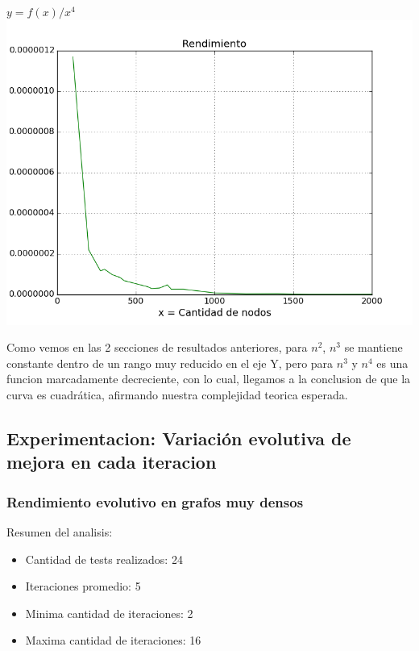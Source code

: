 \begin{center}
	\textbf{$y = f(x)/x^4$}\\
	\includegraphics[scale=0.7]{experimentos/bqlocal/rendimiento_aristas_cuadraticas_3/complexity_med_over_n_fourth.png}
\end{center}

Como vemos en las 2 secciones de resultados anteriores, para $n^2$, $n^3$ se mantiene constante dentro de un rango muy reducido en el eje Y, pero para $n^3$ y $n^4$ es una funcion marcadamente decreciente, con lo cual, llegamos a la conclusion de que la curva es cuadr\'atica, afirmando nuestra complejidad teorica esperada.


\subsection{Experimentacion: Variaci\'on evolutiva de mejora en cada iteracion}
\subsubsection{Rendimiento evolutivo en grafos muy densos}
Resumen del analisis:
\begin{itemize}
	\item Cantidad de tests realizados: 24
	\item Iteraciones promedio: 5
	\item Minima cantidad de iteraciones: 2
	\item Maxima cantidad de iteraciones: 16
\end{itemize}


